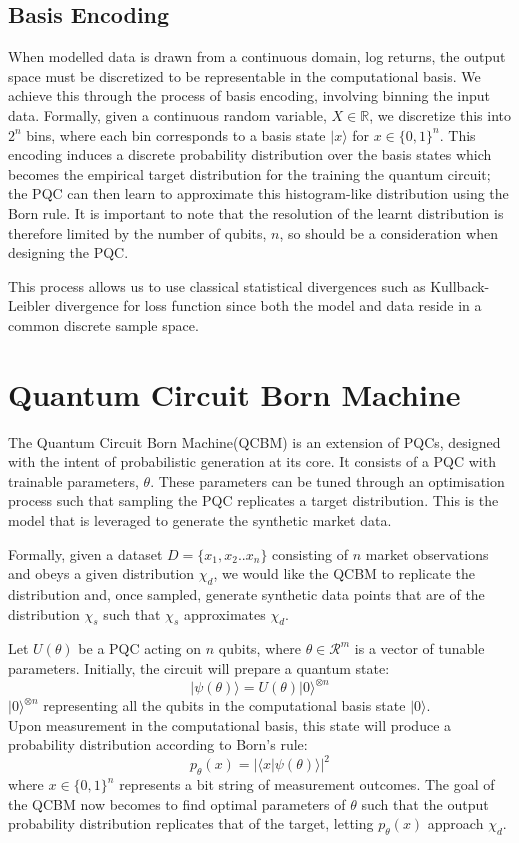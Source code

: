\documentclass[12pt]{article}
\newcommand{\newp}
    {
    \vskip 0.5cm 
  }
\numberwithin{equation}{section}
\begin{document}
\subsection{Basis Encoding}
When modelled data is drawn from a continuous domain, log returns, the output 
space must be discretized to be representable in the computational basis. We 
achieve this through the process of basis encoding, involving binning the 
input data. Formally, given a continuous random variable, $X \in \mathbb{R}$, 
we discretize this into $2^n$ bins, where each bin corresponds to a 
basis state $|x\rangle$ for $x \in \{0,1\}^n$.
This encoding induces a discrete probability distribution over the basis states 
which becomes the empirical target distribution for the training the quantum circuit;
 the PQC can then learn to approximate this histogram-like distribution using the 
Born rule.
It is important to note that the resolution of the learnt distribution is therefore 
limited by the number of qubits, $n$, so should be a consideration when designing 
the PQC. 
\newp 
This process allows us to use classical statistical divergences such as Kullback-Leibler 
divergence for loss function since both the model and data reside in a common 
discrete sample space. 
\newpage
\section{Quantum Circuit Born Machine}
The Quantum Circuit Born Machine(QCBM) is an extension of PQCs, designed with the 
intent of probabilistic generation at its core. It consists of a PQC with trainable 
parameters, $\theta$. These parameters can be tuned through an optimisation process 
such that sampling the PQC replicates a target distribution. This is the model that 
is leveraged to generate the synthetic market data.
\newp
Formally, given a dataset $D = \{x_1, x_2.. x_n\}$ consisting of $n$ market observations and 
obeys a given distribution $\chi_d$, we would like the QCBM to replicate the distribution 
and, once sampled, generate synthetic data points that are of the distribution $\chi_s$ 
such that $\chi_s$ approximates $\chi_d$.
\newp
Let $U(\theta)$ be a PQC acting on $n$ qubits, where $\theta \in \mathcal{R}^m$ 
is a vector of tunable parameters. Initially, the circuit will prepare a quantum 
state:
\begin{equation}
|\psi(\theta)\rangle = U(\theta)|0\rangle^{\otimes n}
\end{equation}
$|0\rangle^{\otimes n}$ representing all the qubits in the computational basis
state $|0\rangle$.\\
Upon measurement in the computational basis, this state will produce a probability 
distribution according to Born's rule: 
\begin{equation}
p_{\theta}(x) = |\langle x|\psi(\theta)\rangle|^2
\end{equation}
where $x\in\{0,1\}^n$ represents a bit string of measurement outcomes. The goal 
of the QCBM now becomes to find optimal parameters of $\theta$ such that the 
output probability distribution replicates that of the target, letting $p_{\theta}
(x)$ approach $\chi_d$.
\end{document}
